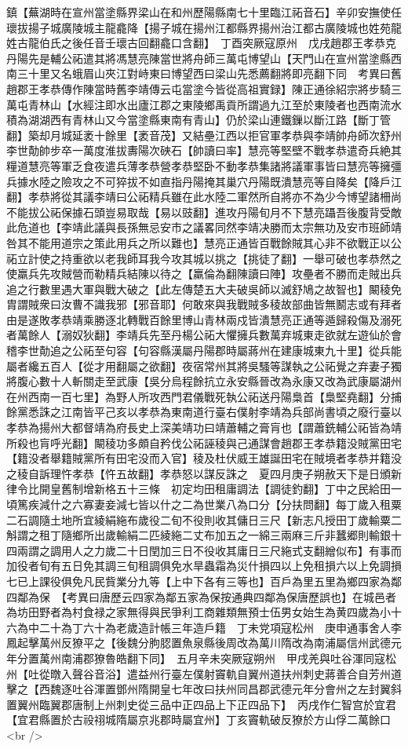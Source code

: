 鎮【蕪湖時在宣州當塗縣界梁山在和州歷陽縣南七十里臨江祏音石】辛卯安撫使任瓌拔揚子城廣陵城主龍龕降【揚子城在揚州江都縣界揚州治江都古廣陵城也姓苑龍姓古龍伯氏之後任音壬瓌古回翻龕口含翻】　丁酉突厥寇原州　戊戌趙郡王孝恭克丹陽先是輔公祏遣其將馮慧亮陳當世將舟師三萬屯博望山【天門山在宣州當塗縣西南三十里又名蛾眉山夾江對峙東曰博望西曰梁山先悉薦翻將即亮翻下同　考異曰舊趙郡王孝恭傳作陳當時舊李靖傳云屯當塗今皆從高祖實録】陳正通徐紹宗將步騎三萬屯青林山【水經注即水出廬江郡之東陵鄉禹貢所謂過九江至於東陵者也西南流水積為湖湖西有青林山又今當塗縣東南有青山】仍於梁山連鐵鏁以斷江路【斷丁管翻】築却月城延袤十餘里【袤音茂】又結壘江西以拒官軍孝恭與李靖帥舟師次舒州李世勣帥步卒一萬度淮拔夀陽次硤石【帥讀曰率】慧亮等堅壁不戰孝恭遣奇兵絶其糧道慧亮等軍乏食夜遣兵薄孝恭營孝恭堅卧不動孝恭集諸將議軍事皆曰慧亮等擁彊兵據水陸之險攻之不可猝拔不如直指丹陽掩其巢穴丹陽既潰慧亮等自降矣【降戶江翻】孝恭將從其議李靖曰公祏精兵雖在此水陸二軍然所自將亦不為少今博望諸柵尚不能拔公祏保據石頭豈易取哉【易以豉翻】進攻丹陽旬月不下慧亮躡吾後腹背受敵此危道也【李靖此議與長孫無忌安市之議畧同然李靖决勝而太宗無功及安市班師靖咎其不能用道宗之策此用兵之所以難也】慧亮正通皆百戰餘賊其心非不欲戰正以公祏立計使之持重欲以老我師耳我今攻其城以挑之【挑徒了翻】一舉可破也孝恭然之使羸兵先攻賊營而勒精兵結陳以待之【羸倫為翻陳讀曰陣】攻壘者不勝而走賊出兵追之行數里遇大軍與戰大破之【此左傳楚五大夫破吳師以滅舒鳩之故智也】闞稜免胄謂賊衆曰汝曹不識我邪【邪音耶】何敢來與我戰賊多稜故部曲皆無鬭志或有拜者由是遂敗孝恭靖乘勝逐北轉戰百餘里博山青林兩戍皆潰慧亮正通等遁歸殺傷及溺死者萬餘人【溺奴狄翻】李靖兵先至丹楊公祏大懼擁兵數萬弃城東走欲就左遊仙於會稽李世勣追之公祏至句容【句容縣漢屬丹陽郡時屬蔣州在建康城東九十里】從兵能屬者纔五百人【從才用翻屬之欲翻】夜宿常州其將吳騷等謀執之公祏覺之弃妻子獨將腹心數十人斬關走至武康【吳分烏程餘抗立永安縣晉改為永康又改為武康屬湖州在州西南一百七里】為野人所攻西門君儀戰死執公祏送丹陽梟首【梟堅堯翻】分捕餘黨悉誅之江南皆平己亥以孝恭為東南道行臺右僕射李靖為兵部尚書頃之廢行臺以孝恭為揚州大都督靖為府長史上深美靖功曰靖蕭輔之膏肓也【謂蕭銑輔公祏皆為靖所殺也肓呼光翻】闞稜功多頗自矜伐公祏誣稜與己通謀會趙郡王孝恭籍没賊黨田宅【籍没者舉籍賊黨所有田宅没而入官】稜及杜伏威王雄誕田宅在賊境者孝恭并籍没之稜自訴理忤孝恭【忤五故翻】孝恭怒以謀反誅之　夏四月庚子朔赦天下是日頒新律令比開皇舊制增新格五十三條　初定均田租庸調法【調徒釣翻】丁中之民給田一頃篤疾減什之六寡妻妾減七皆以什之二為世業八為口分【分扶問翻】每丁歲入租粟二石調隨土地所宜綾絹絁布歲役二旬不役則收其傭日三尺【新志凡授田丁歲輸粟二斛謂之租丁隨鄉所出歲輸絹二匹綾絁二丈布加五之一綿三兩麻三斤非蠶郷則輸銀十四兩謂之調用人之力歲二十日閏加三日不役收其庸日三尺絁式支翻繒似布】有事而加役者旬有五日免其調三旬租調俱免水旱蟲霜為災什損四以上免租損六以上免調損七已上課役俱免凡民貲業分九等【上中下各有三等也】百戶為里五里為鄉四家為鄰四鄰為保　【考異曰唐歷云四家為鄰五家為保按通典四鄰為保唐歷誤也】在城邑者為坊田野者為村食禄之家無得與民爭利工商雜類無預士伍男女始生為黄四歲為小十六為中二十為丁六十為老歲造計帳三年造戶籍　丁未党項寇松州　庚申通事舍人李鳳起擊萬州反獠平之【後魏分朐䏰置魚泉縣後周改為萬川隋改為南浦屬信州武德元年分置萬州南浦郡獠魯皓翻下同】　五月辛未突厥寇朔州　甲戌羌與吐谷渾同寇松州【吐從暾入聲谷音浴】遣益州行臺左僕射竇軌自翼州道扶州刺史蔣善合自芳州道擊之【西魏逐吐谷渾置鄧州隋開皇七年改曰扶州同昌郡武德元年分會州之左封翼斜置翼州臨翼郡唐制上州刺史從三品中正四品上下正四品下】　丙戌作仁智宫於宜君【宜君縣置於古祋祤城隋屬京兆郡時屬宜州】丁亥竇軌破反獠於方山俘二萬餘口<br />
